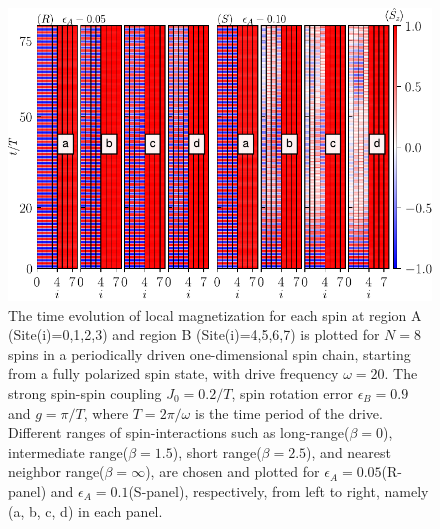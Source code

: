 \documentclass[12pt]{iopart}
\providecommand{\DIFaddtex}[1]{{\protect\color{red}\uwave{#1}}} %
\providecommand{\DIFdelbegin}{} %
\providecommand{\DIFaddFL}[1]{\DIFadd{#1}} %
\providecommand{\DIFaddbeginFL}{} %
\providecommand{\DIFaddendFL}{} %
\providecommand{\DIFdelbeginFL}{} %
\providecommand{\DIFdelendFL}{} %
\providecommand{\DIFadd}[1]{\texorpdfstring{\DIFaddtex{#1}}{#1}} %
\newcommand{\DIFscaledelfig}{0.5}
\newlength{\DIFdelgraphicswidth} %
\newlength{\DIFdelgraphicsheight} %
\newcommand{\DIFaddincludegraphics}[2][]{{\color{blue}\fbox{\DIFOincludegraphics[#1]{#2}}}} %
\newcommand{\DIFdelincludegraphics}[2][]{%
\sbox{\DIFdelgraphicsbox}{\DIFOincludegraphics[#1]{#2}}%
\settoboxwidth{\DIFdelgraphicswidth}{\DIFdelgraphicsbox} %
\settoboxtotalheight{\DIFdelgraphicsheight}{\DIFdelgraphicsbox} %
\scalebox{\DIFscaledelfig}{%
\parbox[b]{\DIFdelgraphicswidth}{\usebox{\DIFdelgraphicsbox}\\[-\baselineskip] \rule{\DIFdelgraphicswidth}{0em}}\llap{\resizebox{\DIFdelgraphicswidth}{\DIFdelgraphicsheight}{%
\setlength{\unitlength}{\DIFdelgraphicswidth}%
\begin{picture}(1,1)%
\thicklines\linethickness{2pt} %
{\color[rgb]{1,0,0}\put(0,0){\framebox(1,1){}}}%
{\color[rgb]{1,0,0}\put(0,0){\line( 1,1){1}}}%
{\color[rgb]{1,0,0}\put(0,1){\line(1,-1){1}}}%
\end{picture}%
}\hspace*{3pt}}} %
} %
\DeclareRobustCommand{\DIFdelbegin}{\DIFOdelbegin \let\includegraphics\DIFdelincludegraphics} %
\DeclareRobustCommand{\DIFaddbeginFL}{\DIFOaddbeginFL \let\includegraphics\DIFaddincludegraphics} %
\DeclareRobustCommand{\DIFaddendFL}{\DIFOaddendFL \let\includegraphics\DIFOincludegraphics} %
\DeclareRobustCommand{\DIFdelbeginFL}{\DIFOdelbeginFL \let\includegraphics\DIFdelincludegraphics} %
\DeclareRobustCommand{\DIFdelendFL}{\DIFOaddendFL \let\includegraphics\DIFOincludegraphics} %
\begin{document}
\begin{figure}[t]
\DIFaddendFL \centering
\DIFdelbeginFL %
\DIFdelendFL \DIFaddbeginFL \DIFaddFL{\hspace{1.5cm}}\includegraphics[width=12cm]{figure6.pdf}
\DIFaddendFL \caption{The time evolution of local magnetization for each spin at region A (Site(i)=0,1,2,3) and region B (Site(i)=4,5,6,7) is plotted for $N=8$ spins in a periodically driven one-dimensional spin chain, starting from a fully polarized spin state, with drive frequency $\omega=20$. The strong spin-spin coupling $J_0 = 0.2/T$, spin rotation error $\epsilon_B = 0.9$ and $g=\pi/T$, where $T=2\pi/\omega$ is the time period of the drive.  Different ranges of spin-interactions such as long-range($\beta=0$), intermediate range($\beta=1.5$), short range($\beta=2.5$), and nearest neighbor range($\beta=\infty$), are chosen and plotted  for $\epsilon_A =0.05$(R-panel) and $\epsilon_A =0.1$(S-panel), respectively, from left to right, namely (a, b, c, d) in each panel.}
\label{Fig:ea}
\end{figure}
\DIFdelbegin %
\end{document}
